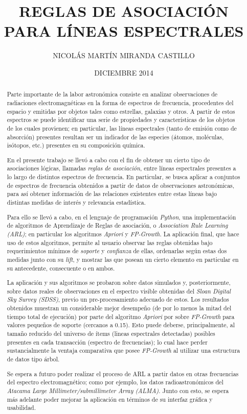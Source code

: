 \documentclass[upright, contnum]{umemoria}
\author{NICOL\'AS MART\'IN MIRANDA CASTILLO}
\title{REGLAS DE ASOCIACI\'ON PARA L\'INEAS ESPECTRALES}
\date{DICIEMBRE 2014}
\begin{document}
\frontmatter
\maketitle

\begin{abstract}
Parte importante de la labor astronómica consiste en analizar observaciones de radiaciones electromagnéticas en la forma de espectros de frecuencia, procedentes del espacio y emitidas por objetos tales como estrellas, galaxias y otros. A partir de estos espectros se puede identificar una serie de propiedades y características de los objetos de los cuales provienen; en particular, las líneas espectrales (tanto de emisión como de absorción) presentes resultan ser un indicador de las especies (átomos, moléculas, isótopos, etc.) presentes en su composición química.

En el presente trabajo se llevó a cabo con el fin de obtener un cierto tipo de asociaciones lógicas, llamadas \textit{reglas de asociación}, entre líneas espectrales presentes a lo largo de distintos espectros de frecuencia. En particular, se busca aplicar a conjuntos de espectros de frecuencia obtenidos a partir de datos de observaciones astronómicas, para así obtener información de las relaciones existentes entre estas líneas bajo distintas medidas de interés y relevancia estadística.

Para ello se llevó a cabo, en el lenguaje de programación \textit{Python}, una implementación de algoritmos de Aprendizaje de Reglas de asociación, o \textit{Association Rule Learning (ARL)}; en particular los algoritmos \textit{Apriori} y \textit{FP-Growth}. La aplicación final, que hace uso de estos algoritmos, permite al usuario observar las reglas obtenidas bajo requerimientos mínimos de \textit{soporte} y \textit{confianza} de ellas, ordenarlas según estas dos medidas junto con su \textit{lift}, y mostrar las que posean un cierto elemento en particular en su antecedente, consecuente o en ambos.

La aplicación y sus algoritmos se probaron sobre datos simulados y, posteriormente, sobre datos reales de observaciones en el espectro visible obtenidas del \textit{Sloan Digital Sky Survey (SDSS)}, previo un pre-procesamiento adecuado de estos. Los resultados obtenidos muestran un considerable mejor desempeño (de por lo menos la mitad del tiempo total de ejecución) por parte del algoritmo \textit{Apriori} por sobre \textit{FP-Growth} para valores pequeños de soporte (cercanos a 0.15). Esto puede deberse, principalmente, al tamaño reducido del universo de ítems (lineas espectrales detectadas) posibles presentes en cada transacción (espectro de frecuencias); lo cual hace perder sustancialmente la ventaja comparativa que posee \textit{FP-Growth} al utilizar una estructura de datos tipo árbol.

Se espera a futuro poder realizar el proceso de ARL a partir datos en otras frecuencias del espectro electromagnético; como por ejemplo, los datos radioastronómicos del \textit{Atacama Large Millimeter/submillimeter Array (ALMA)}. Junto con esto, se espera más adelante poder mejorar la aplicación en términos de su interfaz gráfica y usabilidad.
\end{abstract}
\end{document}
